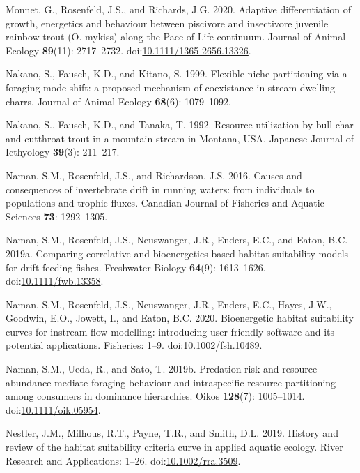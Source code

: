 \documentclass[]{article}
\begin{document}
\hypertarget{ref-Monnet2020}{}
Monnet, G., Rosenfeld, J.S., and Richards, J.G. 2020. Adaptive
differentiation of growth, energetics and behaviour between piscivore
and insectivore juvenile rainbow trout (O. mykiss) along the
Pace‐of‐Life continuum. Journal of Animal Ecology \textbf{89}(11):
2717--2732.
doi:\href{https://doi.org/10.1111/1365-2656.13326}{10.1111/1365-2656.13326}.

\hypertarget{ref-Nakano1999a}{}
Nakano, S., Fausch, K.D., and Kitano, S. 1999. Flexible niche
partitioning via a foraging mode shift: a proposed mechanism of
coexistance in stream-dwelling charrs. Journal of Animal Ecology
\textbf{68}(6): 1079--1092.

\hypertarget{ref-Nakano1992}{}
Nakano, S., Fausch, K.D., and Tanaka, T. 1992. Resource utilization by
bull char and cutthroat trout in a mountain stream in Montana, USA.
Japanese Journal of Icthyology \textbf{39}(3): 211--217.

\hypertarget{ref-Naman2016}{}
Naman, S.M., Rosenfeld, J.S., and Richardson, J.S. 2016. Causes and
consequences of invertebrate drift in running waters: from individuals
to populations and trophic fluxes. Canadian Journal of Fisheries and
Aquatic Sciences \textbf{73}: 1292--1305.

\hypertarget{ref-Naman2019}{}
Naman, S.M., Rosenfeld, J.S., Neuswanger, J.R., Enders, E.C., and Eaton,
B.C. 2019a. Comparing correlative and bioenergetics‐based habitat
suitability models for drift‐feeding fishes. Freshwater Biology
\textbf{64}(9): 1613--1626.
doi:\href{https://doi.org/10.1111/fwb.13358}{10.1111/fwb.13358}.

\hypertarget{ref-Naman2020b}{}
Naman, S.M., Rosenfeld, J.S., Neuswanger, J.R., Enders, E.C., Hayes,
J.W., Goodwin, E.O., Jowett, I., and Eaton, B.C. 2020. Bioenergetic
habitat suitability curves for instream flow modelling: introducing
user‐friendly software and its potential applications. Fisheries: 1--9.
doi:\href{https://doi.org/10.1002/fsh.10489}{10.1002/fsh.10489}.

\hypertarget{ref-Naman2019b}{}
Naman, S.M., Ueda, R., and Sato, T. 2019b. Predation risk and resource
abundance mediate foraging behaviour and intraspecific resource
partitioning among consumers in dominance hierarchies. Oikos
\textbf{128}(7): 1005--1014.
doi:\href{https://doi.org/10.1111/oik.05954}{10.1111/oik.05954}.

\hypertarget{ref-Nestler2019}{}
Nestler, J.M., Milhous, R.T., Payne, T.R., and Smith, D.L. 2019. History
and review of the habitat suitability criteria curve in applied aquatic
ecology. River Research and Applications: 1--26.
doi:\href{https://doi.org/10.1002/rra.3509}{10.1002/rra.3509}.
\end{document}
